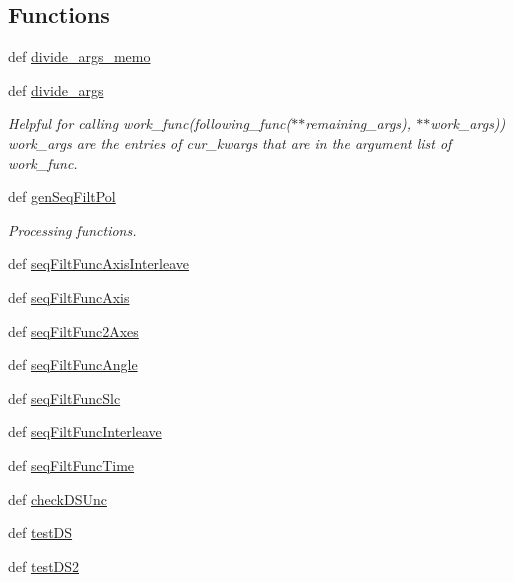 \subsection*{Functions}
\begin{DoxyCompactItemize}
\item 
def \hyperlink{namespacerepo_1_1programs_1_1pythonpackages_1_1pr_1_1SPDataSet_a296fa19993c2ac2fa6db975b8b0f6b88}{divide\-\_\-args\-\_\-memo}
\item 
def \hyperlink{namespacerepo_1_1programs_1_1pythonpackages_1_1pr_1_1SPDataSet_a9d0e07e3e1f4360be4f8c59927abe142}{divide\-\_\-args}
\begin{DoxyCompactList}\small\item\em Helpful for calling work\-\_\-func(following\-\_\-func($\ast$$\ast$remaining\-\_\-args), $\ast$$\ast$work\-\_\-args)) work\-\_\-args are the entries of cur\-\_\-kwargs that are in the argument list of work\-\_\-func. \end{DoxyCompactList}\item 
def \hyperlink{namespacerepo_1_1programs_1_1pythonpackages_1_1pr_1_1SPDataSet_a5a94fa78adaa1ce53cae1e69c7a10c1f}{gen\-Seq\-Filt\-Pol}
\begin{DoxyCompactList}\small\item\em Processing functions. \end{DoxyCompactList}\item 
def \hyperlink{namespacerepo_1_1programs_1_1pythonpackages_1_1pr_1_1SPDataSet_aee5e268a39b4f3d7d26b8cd8c2eb0dce}{seq\-Filt\-Func\-Axis\-Interleave}
\item 
def \hyperlink{namespacerepo_1_1programs_1_1pythonpackages_1_1pr_1_1SPDataSet_acf5db24745ff3b8a02816869e9b10482}{seq\-Filt\-Func\-Axis}
\item 
def \hyperlink{namespacerepo_1_1programs_1_1pythonpackages_1_1pr_1_1SPDataSet_aae98530dd28697279534ad7dd042acd8}{seq\-Filt\-Func2\-Axes}
\item 
def \hyperlink{namespacerepo_1_1programs_1_1pythonpackages_1_1pr_1_1SPDataSet_aa23a4db7857d6d485ae098e21e29cf59}{seq\-Filt\-Func\-Angle}
\item 
def \hyperlink{namespacerepo_1_1programs_1_1pythonpackages_1_1pr_1_1SPDataSet_abc13a280637f719ae917c9f2cf2d9d47}{seq\-Filt\-Func\-Slc}
\item 
def \hyperlink{namespacerepo_1_1programs_1_1pythonpackages_1_1pr_1_1SPDataSet_ae9bed330120419db29ade2d021ca34d7}{seq\-Filt\-Func\-Interleave}
\item 
def \hyperlink{namespacerepo_1_1programs_1_1pythonpackages_1_1pr_1_1SPDataSet_ac07feedd7af03661a0925bdec0d1f1fe}{seq\-Filt\-Func\-Time}
\item 
def \hyperlink{namespacerepo_1_1programs_1_1pythonpackages_1_1pr_1_1SPDataSet_af6b0d8ee29678751051a0b15362f9949}{check\-D\-S\-Unc}
\item 
def \hyperlink{namespacerepo_1_1programs_1_1pythonpackages_1_1pr_1_1SPDataSet_ab3e94a5db004f2a1cbe3b89005731d7c}{test\-D\-S}
\item 
def \hyperlink{namespacerepo_1_1programs_1_1pythonpackages_1_1pr_1_1SPDataSet_ae343b1ec862928d74ae9f6e140008b0d}{test\-D\-S2}
\end{DoxyCompactItemize}
